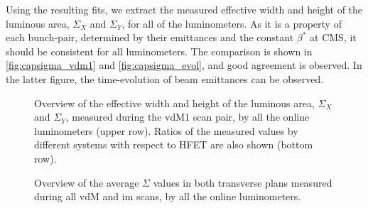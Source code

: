 Using the resulting fits, we extract the measured effective width and height of the luminous area, $\Sigma_X$ and $\Sigma_Y$, for all of the luminometers. As it is a property of each bunch-pair, determined by their emittances and the constant $\beta^{*}$ at CMS, it should be consistent for all luminometers. The comparison is shown in \autoref{fig:capsigma_vdm1} and \autoref{fig:capsigma_evol}, and good agreement is observed. In the latter figure, the time-evolution of beam emittances can be observed.

\begin{figure}[!htb]
	\centering
	\caption[Overview of the measured effective beam overlap widths]{Overview of the effective width and height of the luminous area, $\Sigma_X$ and $\Sigma_Y$, measured during the vdM1 scan pair, by all the online luminometers (upper row). Ratios of the measured values by different systems with respect to HFET are also shown (bottom row).}
	\label{fig:capsigma_vdm1}
\end{figure}

\begin{figure}[!htb]
	\centering
	\caption{Overview of the average $\Sigma$ values in both transverse plans measured during all vdM and im scans, by all the online luminometers.}
	\label{fig:capsigma_evol}
\end{figure}

